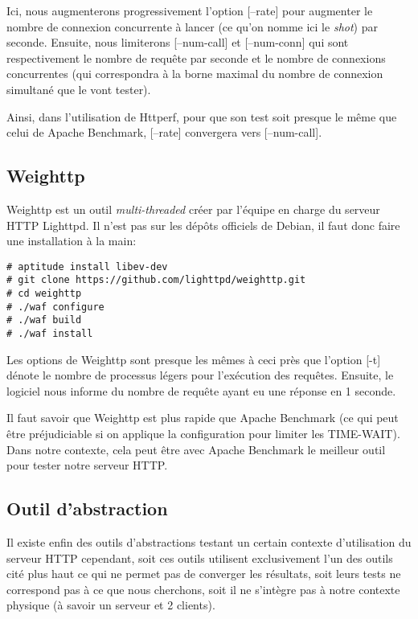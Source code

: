 \documentclass[a4paper, 11pt]{article}
\begin{document}
Ici,  nous  augmenterons progressivement  l'option  [--rate]  pour  augmenter le
nombre de  connexion concurrente à lancer  (ce qu'on  nomme ici  le \emph{shot})
par seconde.  Ensuite,  nous  limiterons [--num-call] et  [--num-conn] qui sont
respectivement le nombre  de  requête  par  seconde  et  le nombre de connexions
concurrentes  (qui  correspondra  à la  borne  maximal  du  nombre  de connexion
simultané que le vont tester).

Ainsi,  dans l'utilisation de  Httperf,  pour que son test soit  presque le même
que celui de Apache Benchmark, [--rate] convergera vers [--num-call].

\subsection{Weighttp}

Weighttp  est un  outil \emph{multi-threaded}  créer par  l'équipe en  charge du
serveur HTTP Lighttpd.  Il n'est pas sur les dépôts officiels de Debian, il faut
donc faire une installation à la main:

\begin{lstlisting}
# aptitude install libev-dev
# git clone https://github.com/lighttpd/weighttp.git
# cd weighttp
# ./waf configure
# ./waf build
# ./waf install
\end{lstlisting}

Les options  de Weighttp sont  presque les mêmes  à ceci près  que l'option [-t]
dénote le nombre de processus légers pour l'exécution des requêtes.  Ensuite, le
logiciel nous informe du nombre de requête ayant eu une réponse en 1 seconde.

Il faut savoir  que Weighttp est plus  rapide que Apache Benchmark  (ce qui peut
être préjudiciable si on applique  la configuration pour limiter les TIME-WAIT).
Dans notre  contexte,  cela peut  être avec Apache  Benchmark le  meilleur outil
pour tester notre serveur HTTP.

\subsection{Outil d'abstraction}

Il  existe  enfin   des  outils  d'abstractions  testant   un  certain  contexte
d'utilisation   du  serveur   HTTP   cependant,   soit   ces   outils  utilisent
exclusivement l'un des outils  cité plus haut ce qui ne  permet pas de converger
les résultats,  soit leurs tests ne correspond pas à ce que nous cherchons, soit
il  ne s'intègre  pas à  notre contexte  physique  (à  savoir  un  serveur  et 2
clients).
\end{document}
